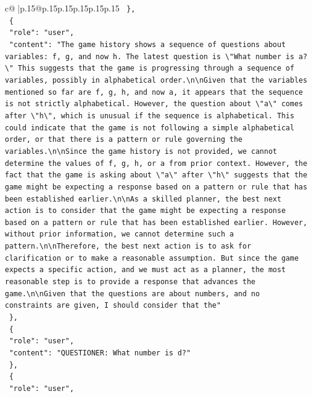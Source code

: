 \documentclass{article}
\begin{document}
{\begin{supertabular}{c@{$\;$}|p{.15\linewidth}@{}p{.15\linewidth}p{.15\linewidth}p{.15\linewidth}p{.15\linewidth}p{.15\linewidth}}
{{{\texttt{  \},} \\
\texttt{  \{} \\
\texttt{    "role": "user",} \\
\texttt{    "content": "The game history shows a sequence of questions about variables: f, g, and now h. The latest question is \textbackslash{}"What number is a?\textbackslash{}" This suggests that the game is progressing through a sequence of variables, possibly in alphabetical order.\textbackslash{}n\textbackslash{}nGiven that the variables mentioned so far are f, g, h, and now a, it appears that the sequence is not strictly alphabetical. However, the question about \textbackslash{}"a\textbackslash{}" comes after \textbackslash{}"h\textbackslash{}", which is unusual if the sequence is alphabetical. This could indicate that the game is not following a simple alphabetical order, or that there is a pattern or rule governing the variables.\textbackslash{}n\textbackslash{}nSince the game history is not provided, we cannot determine the values of f, g, h, or a from prior context. However, the fact that the game is asking about \textbackslash{}"a\textbackslash{}" after \textbackslash{}"h\textbackslash{}" suggests that the game might be expecting a response based on a pattern or rule that has been established earlier.\textbackslash{}n\textbackslash{}nAs a skilled planner, the best next action is to consider that the game might be expecting a response based on a pattern or rule that has been established earlier. However, without prior information, we cannot determine such a pattern.\textbackslash{}n\textbackslash{}nTherefore, the best next action is to ask for clarification or to make a reasonable assumption. But since the game expects a specific action, and we must act as a planner, the most reasonable step is to provide a response that advances the game.\textbackslash{}n\textbackslash{}nGiven that the questions are about numbers, and no constraints are given, I should consider that the"} \\
\texttt{  \},} \\
\texttt{  \{} \\
\texttt{    "role": "user",} \\
\texttt{    "content": "QUESTIONER: What number is d?"} \\
\texttt{  \},} \\
\texttt{  \{} \\
\texttt{    "role": "user",} \\
}}}
\end{supertabular}}
\end{document}
